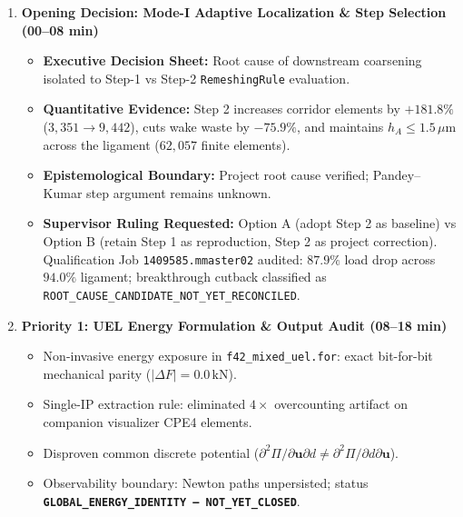 \documentclass[10pt,a4paper]{article}
\begin{document}
\begin{enumerate}[label=\textbf{\arabic*.},leftmargin=5mm,itemsep=2.5pt,topsep=1.5pt]
  \item \textbf{Opening Decision: Mode-I Adaptive Localization \& Step Selection (00--08 min)}
  \begin{itemize}[itemsep=0.8pt,topsep=0.8pt,leftmargin=4mm]
    \small
    \item \textbf{Executive Decision Sheet:} Root cause of downstream coarsening isolated to Step-1 vs Step-2 \texttt{RemeshingRule} evaluation.
    \item \textbf{Quantitative Evidence:} Step 2 increases corridor elements by $+181.8\%$ ($3{,}351 \to 9{,}442$), cuts wake waste by $-75.9\%$, and maintains $h_A \le 1.5\,\mu\mathrm{m}$ across the ligament ($62{,}057$ finite elements).
    \item \textbf{Epistemological Boundary:} Project root cause verified; Pandey--Kumar step argument remains unknown.
    \item \textbf{Supervisor Ruling Requested:} Option A (adopt Step 2 as baseline) vs Option B (retain Step 1 as reproduction, Step 2 as project correction). Qualification Job \texttt{1409585.mmaster02} audited: $87.9\%$ load drop across $94.0\%$ ligament; breakthrough cutback classified as \texttt{ROOT\_CAUSE\_CANDIDATE\_NOT\_YET\_RECONCILED}.
  \end{itemize}

  \item \textbf{Priority 1: UEL Energy Formulation \& Output Audit (08--18 min)}
  \begin{itemize}[itemsep=0.8pt,topsep=0.8pt,leftmargin=4mm]
    \small
    \item Non-invasive energy exposure in \texttt{f42\_mixed\_uel.for}: exact bit-for-bit mechanical parity ($|\Delta F| = 0.0\,\mathrm{kN}$).
    \item Single-IP extraction rule: eliminated $4\times$ overcounting artifact on companion visualizer CPE4 elements.
    \item Disproven common discrete potential ($\partial^2 \Pi / \partial \mathbf{u} \partial d \ne \partial^2 \Pi / \partial d \partial \mathbf{u}$).
    \item Observability boundary: Newton paths unpersisted; status \textbf{\texttt{GLOBAL\_ENERGY\_IDENTITY\allowbreak\ --- \allowbreak NOT\_YET\_CLOSED}}.
  \end{itemize}


\end{enumerate}
\end{document}
